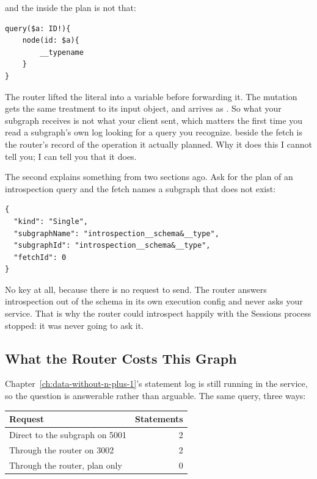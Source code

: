 and the  inside the plan is not that:

\begin{verbatim}
query($a: ID!){
    node(id: $a){
        __typename
    }
}
\end{verbatim}

%
The router lifted the literal into a variable before forwarding it. The mutation
gets the same treatment to its input object, and 
arrives as . So what your subgraph receives is not what
your client sent, which matters the first time you read a subgraph's own log
looking for a query you recognize.  beside the fetch is
the router's record of the operation it actually planned. Why it does this I
cannot tell you; I can tell you that it does.

%
The second explains something from two sections ago. Ask for the plan of an
introspection query and the fetch names a subgraph that does not exist:

\begin{verbatim}
{
  "kind": "Single",
  "subgraphName": "introspection__schema&__type",
  "subgraphId": "introspection__schema&__type",
  "fetchId": 0
}
\end{verbatim}

%
No  key at all, because there is no request to send. The router
answers introspection out of the schema in its own execution config and never
asks your service. That is why the router could introspect happily with the
Sessions process stopped: it was never going to ask it.

\subsection{What the Router Costs This Graph}

%
Chapter~\ref{ch:data-without-n-plus-1}'s statement log is still running in the
service, so the question is answerable rather than arguable. The same query,
three ways:

\begin{center}
\begin{tabular}{lr}
\toprule
Request & Statements \\
\midrule
Direct to the subgraph on 5001 & 2 \\
Through the router on 3002 & 2 \\
Through the router, plan only & 0 \\
\bottomrule
\end{tabular}
\end{center}

